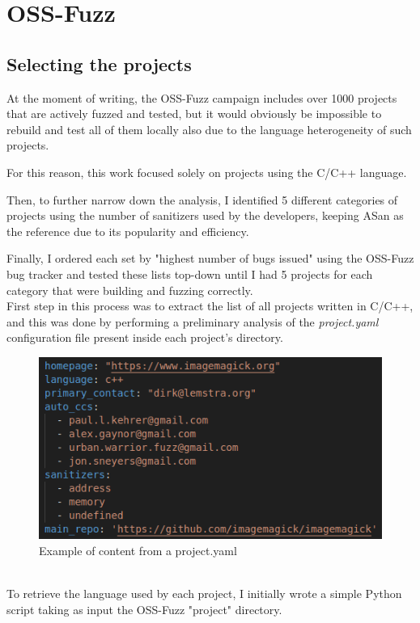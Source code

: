 \newpage
\section{OSS-Fuzz}
\subsection{Selecting the projects} \label{selection}
At the moment of writing, the OSS-Fuzz campaign includes over 1000 projects that are actively fuzzed and tested, but it would obviously be impossible to rebuild and test all of them locally also due to the language heterogeneity of such projects.

For this reason, this work focused solely on projects using the C/C++ language.

Then, to further narrow down the analysis, I identified 5 different categories of projects using the number of sanitizers used by the developers, keeping ASan as the reference due to its popularity and efficiency.

Finally, I ordered each set by "highest number of bugs issued" using the OSS-Fuzz bug tracker and tested these lists top-down until I had 5 projects for each category that were building and fuzzing correctly.
\ \\ 
 

First step in this process was to extract the list of all projects written in C/C++, and this was done by performing a preliminary analysis of the \textit{project.yaml} configuration file present inside each project's directory.
\newline
\begin{figure}[h]
\centering
\includegraphics[scale=0.65]{foto/project_yaml.png}
\caption{Example of content from a project.yaml}
\label{fig:project_yaml}
\end{figure}
\ \\
To retrieve the language used by each project, I initially wrote a simple Python script taking as input the OSS-Fuzz "project" directory.

